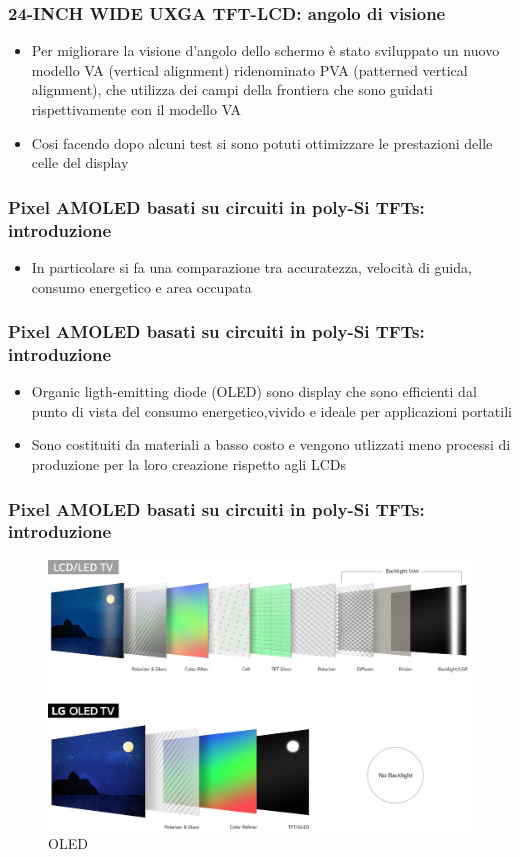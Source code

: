 \documentclass[12pt]{beamer}
\begin{document}
	\begin{frame}
		\frametitle{24-INCH WIDE UXGA TFT-LCD: angolo di visione}
		\begin{itemize}
			\item Per migliorare la visione d’angolo dello schermo è stato sviluppato un nuovo
			modello VA (vertical alignment) ridenominato PVA (patterned
			vertical alignment), che utilizza dei campi della frontiera che sono guidati rispettivamente con il modello VA
			\pause
			\item Cosi facendo dopo alcuni test si sono potuti ottimizzare le prestazioni delle celle del display 
		\end{itemize}
	\end{frame}
	\begin{frame}
		\frametitle{Pixel AMOLED basati su circuiti in poly-Si TFTs: introduzione}
		\begin{itemize}
			\item In particolare si fa una comparazione tra accuratezza, velocità di guida, consumo
			energetico e area occupata
		\end{itemize}
	\end{frame}
	\begin{frame}
		\frametitle{Pixel AMOLED basati su circuiti in poly-Si TFTs: introduzione}
		\begin{itemize}
			\item Organic ligth-emitting diode (OLED) sono display che sono efficienti dal punto di vista del consumo energetico,vivido e ideale per applicazioni portatili 
			\pause
			\item Sono costituiti da materiali a basso costo e vengono utlizzati meno processi di produzione per la loro creazione rispetto agli LCDs
		\end{itemize}
	\end{frame}
	\begin{frame}
		\frametitle{Pixel AMOLED basati su circuiti in poly-Si TFTs: introduzione}
		\begin{figure}
			\centering
			\includegraphics[width=1\linewidth]{IMMAGINI/oled}
			\caption{OLED}
			\label{fig:oled}
		\end{figure}
	\end{frame}
\end{document}
